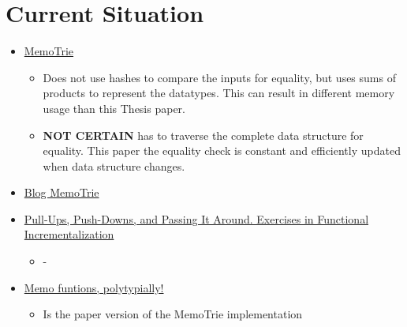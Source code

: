 \section{Current Situation}
\begin{itemize}
  \item \href{https://hackage.haskell.org/package/MemoTrie}{MemoTrie}
  \begin{itemize}
    \item Does not use hashes to compare the inputs for equality, but uses sums of products to represent the datatypes. This can result in different memory usage than this Thesis paper. 
    \item \textbf{NOT CERTAIN} has to traverse the complete data structure for equality. This paper the equality check is constant and efficiently updated when data structure changes.
  \end{itemize}
  \item \href{https://monospacedmonologues.com/2022/01/memotries/}{Blog MemoTrie}
  \item \href{https://www.cs.uu.nl/research/techreps/repo/CS-2009/2009-024.pdf}{Pull-Ups, Push-Downs, and Passing It Around.
  Exercises in Functional Incrementalization}
  \begin{itemize}
    \item -
  \end{itemize}
  \item \href{https://citeseerx.ist.psu.edu/viewdoc/download?doi=10.1.1.43.3272&rep=rep1&type=pdf}{Memo funtions, polytypially!}
  \begin{itemize}
    \item Is the paper version of the MemoTrie implementation
  \end{itemize}
\end{itemize}